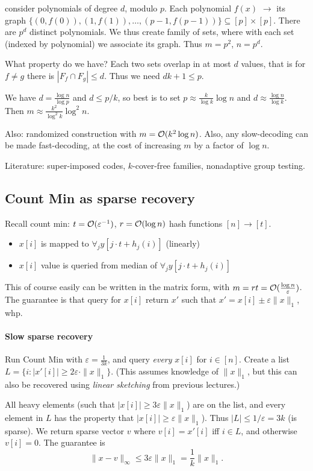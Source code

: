 \documentclass[11pt]{article}
\begin{document}
consider polynomials of degree $d$, modulo $p$. Each polynomial $f(x)$ $\to$ its graph $\{(0,f(0)), (1,f(1)), \ldots, (p-1,f(p-1))\} \subseteq [p] \times [p]$. There are $p^d$ distinct polynomials. We thus create family of sets, where with each set (indexed by polynomial) we associate its graph. Thus $m = p^2$, $n = p^d$.

What property do we have? Each two sets overlap in at most $d$ values, that is for $f \not = g$ there is $|F_f \cap F_g| \le d$. Thus we need $dk + 1 \le p$.

We have $d = \frac{\log n}{\log p}$ and $d \le p/k$, so best is to set $p \approx \frac{k}{\log k} \log n$ and $d \approx \frac{\log n}{\log k}$. Then $m \approx \frac{k^2}{\log^2 k} \log^2 n$.


Also: randomized construction with $m =\mathcal{O}(k^2 \log n)$. Also, any slow-decoding can be made fast-decoding, at the cost of increasing $m$ by a factor of $\log n$.

Literature: super-imposed codes, $k$-cover-free families, nonadaptive group testing.
\subsection{Count Min as sparse recovery}
Recall count min: $t = \mathcal{O}(\varepsilon^{-1})$, $r = \mathcal{O}(\log n)$ hash functions $[n] \to [t]$.
\begin{itemize}
\item $x[i]$ is mapped to $\forall_j y[j \cdot t + h_j(i)]$ (linearly)
\item $x[i]$ value is queried from median of $\forall_j y[j \cdot t + h_j(i)]$
\end{itemize}
This of course easily can be written in the matrix form, with $m = rt = \mathcal{O}(\frac{\log n}{\varepsilon})$. 
The guarantee is that query for $x[i]$ return $x'$ such that $x' = x[i] \pm \varepsilon \|x\|_1$, whp.

\paragraph{Slow sparse recovery}
Run Count Min with $\varepsilon = \frac{1}{3k}$, and query \emph{every} $x[i]$ for $i \in [n]$. Create a list $L = \{ i : |x'[i]| \ge  2\varepsilon \cdot \|x\|_1 \}$. (This assumes knowledge of $\|x\|_1$, but this can also be recovered using \emph{linear sketching} from previous lectures.)

All heavy elements (such that $|x[i]| \ge 3 \varepsilon \|x\|_1$) are on the list, and every element in $L$ has the property that $|x[i]| \ge \varepsilon \|x\|_1$). Thus $|L| \le 1/\varepsilon = 3k$ (is sparse). We return sparse vector $v$ where $v[i] = x'[i]$ iff $i \in L$, and otherwise $v[i] = 0$. The guarantee is
$$ \|x-v\|_\infty \le 3\varepsilon \|x\|_1 = \frac{1}{k} \|x\|_1.$$
\end{document}
